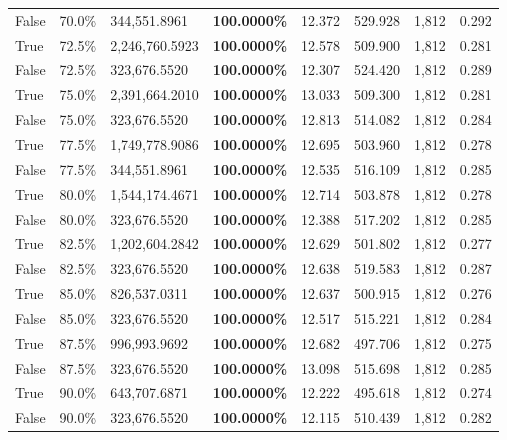 \begin{table}[H]
\begin{tabular}{lllrllll}
\cline{1-8}
False & 70.0\% & 344,551.8961 & \bfseries \color{red} 100.0000\% & 12.372 & 529.928 & 1,812 & 0.292 \\
\cline{1-8}
True & 72.5\% & 2,246,760.5923 & \bfseries \color{red} 100.0000\% & 12.578 & 509.900 & 1,812 & 0.281 \\
\cline{1-8}
False & 72.5\% & 323,676.5520 & \bfseries \color{red} 100.0000\% & 12.307 & 524.420 & 1,812 & 0.289 \\
\cline{1-8}
True & 75.0\% & 2,391,664.2010 & \bfseries \color{red} 100.0000\% & 13.033 & 509.300 & 1,812 & 0.281 \\
\cline{1-8}
False & 75.0\% & 323,676.5520 & \bfseries \color{red} 100.0000\% & 12.813 & 514.082 & 1,812 & 0.284 \\
\cline{1-8}
True & 77.5\% & 1,749,778.9086 & \bfseries \color{red} 100.0000\% & 12.695 & 503.960 & 1,812 & 0.278 \\
\cline{1-8}
False & 77.5\% & 344,551.8961 & \bfseries \color{red} 100.0000\% & 12.535 & 516.109 & 1,812 & 0.285 \\
\cline{1-8}
True & 80.0\% & 1,544,174.4671 & \bfseries \color{red} 100.0000\% & 12.714 & 503.878 & 1,812 & 0.278 \\
\cline{1-8}
False & 80.0\% & 323,676.5520 & \bfseries \color{red} 100.0000\% & 12.388 & 517.202 & 1,812 & 0.285 \\
\cline{1-8}
True & 82.5\% & 1,202,604.2842 & \bfseries \color{red} 100.0000\% & 12.629 & 501.802 & 1,812 & 0.277 \\
\cline{1-8}
False & 82.5\% & 323,676.5520 & \bfseries \color{red} 100.0000\% & 12.638 & 519.583 & 1,812 & 0.287 \\
\cline{1-8}
True & 85.0\% & 826,537.0311 & \bfseries \color{red} 100.0000\% & 12.637 & 500.915 & 1,812 & 0.276 \\
\cline{1-8}
False & 85.0\% & 323,676.5520 & \bfseries \color{red} 100.0000\% & 12.517 & 515.221 & 1,812 & 0.284 \\
\cline{1-8}
True & 87.5\% & 996,993.9692 & \bfseries \color{red} 100.0000\% & 12.682 & 497.706 & 1,812 & 0.275 \\
\cline{1-8}
False & 87.5\% & 323,676.5520 & \bfseries \color{red} 100.0000\% & 13.098 & 515.698 & 1,812 & 0.285 \\
\cline{1-8}
True & 90.0\% & 643,707.6871 & \bfseries \color{red} 100.0000\% & 12.222 & 495.618 & 1,812 & 0.274 \\
\cline{1-8}
False & 90.0\% & 323,676.5520 & \bfseries \color{red} 100.0000\% & 12.115 & 510.439 & 1,812 & 0.282 \\

\end{tabular}
\end{table}
